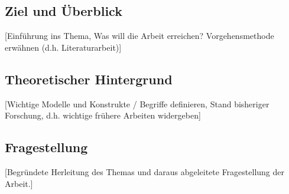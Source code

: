 \label{chap:gliederung} 

\label{section.ziel}

\subsection{Ziel und Überblick}

[Einführung ins Thema, Was will die Arbeit erreichen? Vorgehensmethode erwähnen (d.h. Literaturarbeit)]


\subsection{Theoretischer Hintergrund}
\label{subsection:Theoretischer Hintergrund}

[Wichtige Modelle und Konstrukte / Begriffe definieren, Stand bisheriger Forschung, d.h. wichtige frühere Arbeiten widergeben]   


\subsection{Fragestellung}

[Begründete Herleitung des Themas und daraus abgeleitete Fragestellung der Arbeit.]